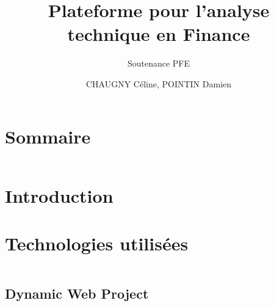 \documentclass{beamer}
\title{Plateforme pour l'analyse technique en Finance}
\subtitle{Soutenance PFE}
\author{CHAUGNY Céline, POINTIN Damien}
\institute{Génie Mathématique | INSA Rouen}
\begin{document}
    \beamertemplatenavigationsymbolsempty

    \begin{frame}
        \titlepage{}
    \end{frame}

    \section*{Sommaire}
        \begin{frame}
            \begin{columns}[t]
  				\begin{column}{5cm}
  					\tableofcontents[sections={1-4},  hideothersubsections]
  				\end{column}
  				\begin{column}{5cm}
  				\tableofcontents[sections={5-9}, hideothersubsections]
  				\end{column}
  			\end{columns}
        \end{frame}

    \section{Introduction}
        \subsection{ }
            

    \section{Technologies utilisées}
        \begin{frame}
            \begin{columns}[t]
  				\begin{column}{5cm}
  					\tableofcontents[sections={1-4}, currentsection, hideothersubsections]
  				\end{column}
  				\begin{column}{5cm}
  				\tableofcontents[sections={5-9}, currentsection, hideothersubsections]
  				\end{column}
  			\end{columns}
        \end{frame}
         \subsection{Dynamic Web Project}
	        
\end{document}
